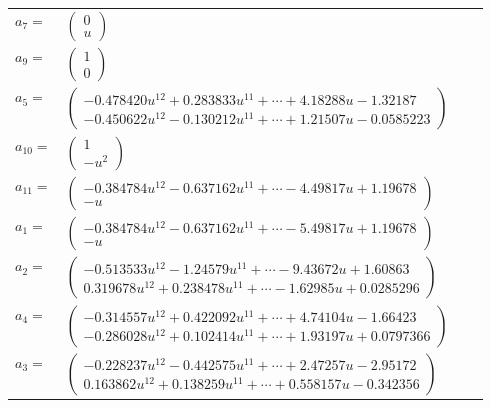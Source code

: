 \documentclass[1p]{elsarticle_modified}
\theoremstyle{definition}
\begin{document}
\begin{tabular}{m{7pt} m{180pt} m{7pt} m{180pt} }
\flushright $a_{7}=$&$\begin{pmatrix}0\\u\end{pmatrix}$ \\
\flushright $a_{9}=$&$\begin{pmatrix}1\\0\end{pmatrix}$ \\
\flushright $a_{5}=$&$\begin{pmatrix}-0.478420 u^{12}+0.283833 u^{11}+\cdots+4.18288 u-1.32187\\-0.450622 u^{12}-0.130212 u^{11}+\cdots+1.21507 u-0.0585223\end{pmatrix}$ \\
\flushright $a_{10}=$&$\begin{pmatrix}1\\- u^2\end{pmatrix}$ \\
\flushright $a_{11}=$&$\begin{pmatrix}-0.384784 u^{12}-0.637162 u^{11}+\cdots-4.49817 u+1.19678\\- u\end{pmatrix}$ \\
\flushright $a_{1}=$&$\begin{pmatrix}-0.384784 u^{12}-0.637162 u^{11}+\cdots-5.49817 u+1.19678\\- u\end{pmatrix}$ \\
\flushright $a_{2}=$&$\begin{pmatrix}-0.513533 u^{12}-1.24579 u^{11}+\cdots-9.43672 u+1.60863\\0.319678 u^{12}+0.238478 u^{11}+\cdots-1.62985 u+0.0285296\end{pmatrix}$ \\
\flushright $a_{4}=$&$\begin{pmatrix}-0.314557 u^{12}+0.422092 u^{11}+\cdots+4.74104 u-1.66423\\-0.286028 u^{12}+0.102414 u^{11}+\cdots+1.93197 u+0.0797366\end{pmatrix}$ \\
\flushright $a_{3}=$&$\begin{pmatrix}-0.228237 u^{12}-0.442575 u^{11}+\cdots+2.47257 u-2.95172\\0.163862 u^{12}+0.138259 u^{11}+\cdots+0.558157 u-0.342356\end{pmatrix}$ \\

\end{tabular}
\end{document}

